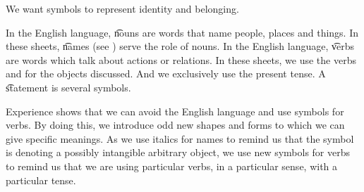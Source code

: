 

We want symbols to represent identity and belonging.


In the English language, \t{nouns} are words that name people, places and things.
In these sheets, \t{names} (see ) serve the role of nouns.
In the English language, \t{verbs} are words which talk about actions or relations.
In these sheets, we use the verbs  and  for the objects discussed.
And we exclusively use the present tense.
A \t{statement} is several symbols.

Experience shows that we can avoid the English language and use symbols for verbs.
By doing this, we introduce odd new shapes and forms to which we can give specific meanings.
As we use italics for names to remind us that the symbol is denoting a possibly intangible arbitrary object, we use new symbols for verbs to remind us that we are using particular verbs, in a particular sense, with a particular tense.




